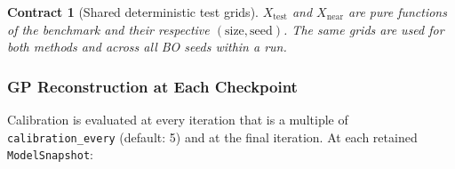 \documentclass[11pt]{article}
\newtheorem{contract}{Contract}
\begin{document}
\begin{contract}[Shared deterministic test grids]
\label{contract:testgrid}
$X_{\mathrm{test}}$ and $X_{\mathrm{near}}$ are pure functions of the benchmark
and their respective $(\text{size},\text{seed})$.
The same grids are used for both methods and across all BO seeds within a run.
\end{contract}
 
\subsubsection{GP Reconstruction at Each Checkpoint}
 
Calibration is evaluated at every iteration that is a multiple of
\texttt{calibration\_every} (default: 5) and at the final iteration.
At each retained \texttt{ModelSnapshot}:
 
\end{document}
